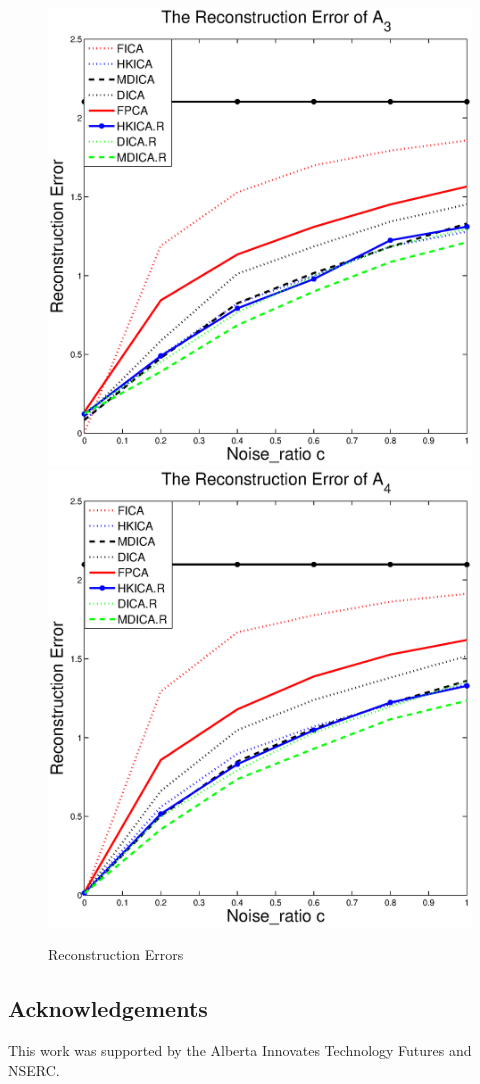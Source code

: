 \documentclass[11pt]{article}
\begin{document}
\begin{figure}[ht]
	\includegraphics[width =0.4\columnwidth]{images/error3} \\
	\includegraphics[width =0.4\columnwidth]{images/error4}
	\caption{
		\label{fig:Error}
		Reconstruction Errors}
\end{figure}
\subsection*{Acknowledgements}
This work was supported by the Alberta Innovates Technology Futures
and NSERC.
 



\end{document}

